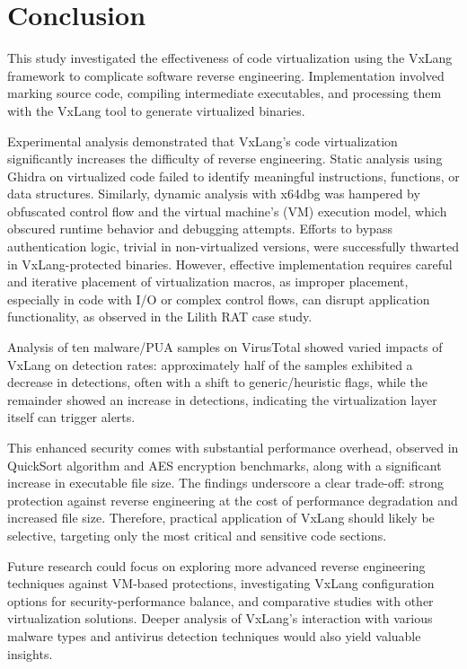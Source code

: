 \section{Conclusion}
\label{sec:conclusion_jurnal_ui_ana_en_condensed}

This study investigated the effectiveness of code virtualization using the VxLang framework to complicate software reverse engineering. Implementation involved marking source code, compiling intermediate executables, and processing them with the VxLang tool to generate virtualized binaries.

Experimental analysis demonstrated that VxLang's code virtualization significantly increases the difficulty of reverse engineering. Static analysis using Ghidra on virtualized code failed to identify meaningful instructions, functions, or data structures. Similarly, dynamic analysis with x64dbg was hampered by obfuscated control flow and the virtual machine's (VM) execution model, which obscured runtime behavior and debugging attempts. Efforts to bypass authentication logic, trivial in non-virtualized versions, were successfully thwarted in VxLang-protected binaries. However, effective implementation requires careful and iterative placement of virtualization macros, as improper placement, especially in code with I/O or complex control flows, can disrupt application functionality, as observed in the Lilith RAT case study.

Analysis of ten malware/PUA samples on VirusTotal showed varied impacts of VxLang on detection rates: approximately half of the samples exhibited a decrease in detections, often with a shift to generic/heuristic flags, while the remainder showed an increase in detections, indicating the virtualization layer itself can trigger alerts.

This enhanced security comes with substantial performance overhead, observed in QuickSort algorithm and AES encryption benchmarks, along with a significant increase in executable file size. The findings underscore a clear trade-off: strong protection against reverse engineering at the cost of performance degradation and increased file size. Therefore, practical application of VxLang should likely be selective, targeting only the most critical and sensitive code sections.

Future research could focus on exploring more advanced reverse engineering techniques against VM-based protections, investigating VxLang configuration options for security-performance balance, and comparative studies with other virtualization solutions. Deeper analysis of VxLang's interaction with various malware types and antivirus detection techniques would also yield valuable insights.
